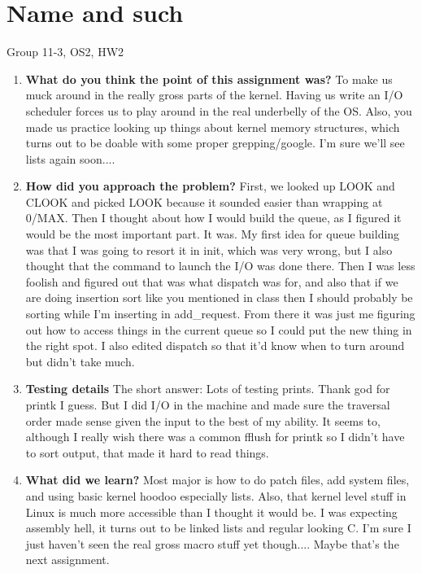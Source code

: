 \documentclass[IEEEtran,letterpaper,10pt,notitlepage,draftclsnofoot,onecolumn]{article}
\begin{document}
\section{Name and such}
Group 11-3, OS2, HW2

\begin{enumerate}
\item 
\textbf{What do you think the point of this assignment was?}
To make us muck around in the really gross parts of the kernel. 
Having us write an I/O scheduler forces us to play around
in the real underbelly of the OS. Also, you made us practice
looking up things about kernel memory structures, which turns
out to be doable with some proper grepping/google. I'm sure
we'll see lists again soon....

\item 
\textbf{How did you approach the problem?}
First, we looked up LOOK and CLOOK and picked LOOK because
it sounded easier than wrapping at 0/MAX. Then I thought
about how I would build the queue, as I figured it would
be the most important part. It was. My first idea for 
queue building was that I was going to resort it in
init, which was very wrong, but I also thought that
the command to launch the I/O was done there. Then I 
was less foolish and figured out that was what dispatch 
was for, and also that if we are doing insertion sort like
you mentioned in class then I should probably be sorting
while I'm inserting in add\_request. From there it was just
me figuring out how to access things in the current queue
so I could put the new thing in the right spot.
I also edited dispatch so that it'd know when to turn around
but didn't take much.

\item
\textbf{Testing details}
The short answer: Lots of testing prints. Thank god for
printk I guess. But I did I/O in the machine and made sure
the traversal order made sense given the input to the best
of my ability. It seems to, although I really wish there
was a common fflush for printk so I didn't have to sort 
output, that made it hard to read things.
\item
\textbf{What did we learn?}
Most major is how to do patch files, add system files,
and using basic kernel hoodoo especially lists.
Also, that kernel level stuff in Linux is much more
accessible than I thought it would be. I was expecting
assembly hell, it turns out to be linked lists and regular
looking C. I'm sure I just haven't seen the real gross
macro stuff yet though....
Maybe that's the next assignment.
\end{enumerate}
\end{document}
